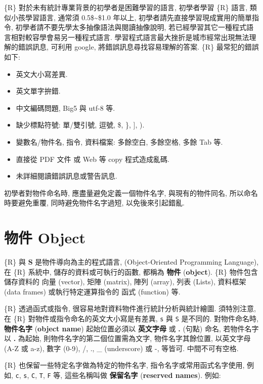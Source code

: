 \documentclass[
]{book}
\providecommand{\tightlist}{%
  \setlength{\itemsep}{0pt}\setlength{\parskip}{0pt}}
\begin{document}
\{R\} 對於未有統計專業背景的初學者是困難學習的語言,
初學者學習 \{R\} 語言, 類似小孩學習語言,
通常須 0.5\$\sim\$1.0 年以上,
初學者請先直接學習現成實用的簡單指令,
初學者請不要先學太多抽像語法與閱讀抽像說明,
若已經學習其它一種程式語言相對較容學會易另一種程式語言.
學習程式語言最大挫折是城市經常出現無法理解的錯誤訊息,
可利用 google, 將錯誤訊息尋找容易理解的答案.
\{R\} 最常犯的錯誤如下:

\begin{itemize}
\tightlist
\item
  英文大小寫差異.
\item
  英文單字拚錯.
\item
  中文編碼問題, Big5 與 utf-8 等.
\item
  缺少標點符號: 單/雙引號, 逗號, \$, \}, {]}, ).
\item
  變數名/物件名, 指令, 資料檔案: 多餘空白, 多餘空格, 多餘 Tab 等.
\item
  直接從 PDF 文件 或 Web 等 copy 程式造成亂碼.
\item
  未詳細閱讀錯誤訊息或警告訊息.
\end{itemize}

初學者對物件命名時, 應盡量避免定義一個物件名字,
與現有的物件同名, 所以命名時要避免重覆,
同時避免物件名字過短, 以免後來引起錯亂.

\hypertarget{ux7269ux4ef6-object}{%
\section{物件 Object}\label{ux7269ux4ef6-object}}

\{R\} 與 \textbf{S} 是物件導向為主的程式語言,
(Object-Oriented Programming Language),
在 \{R\} 系統中, 儲存的資料或可執行的函數, 都稱為
\textbf{物件}
(\textbf{object}).
\{R\} 物件包含儲存資料的
向量 (vector), 矩陣 (matrix), 陣列 (array), 列表 (Lists),
資料框架 (data frames)
或執行特定運算指令的
函式 (function) 等.

\{R\} 透過函式或指令, 很容易地對資料物件進行統計分析與統計繪圖.
須特別注意, 在 \{R\} 對物件或指令命名的英文大小寫是有差異,
\texttt{s} 與 \texttt{S} 是不同的.
對物件命名時,
\textbf{物件名字}
(\textbf{object name})
起始位置必須以 \textbf{英文字母} 或 \textbf{.} (句點) 命名,
若物件名字以 \textbf{.} 為起始,
則物件名字的第二個位置需為文字,
物件名字其餘位置,
以英文字母 (A-Z 或 a-z),
數字 (0-9), /, ., \_ (underscore) 或 -, 等皆可.
中間不可有空格.

\{R\} 也保留一些特定名字做為特定的物件名字,
指令名字或常用函式名字使用,
例如, \texttt{c}, \texttt{s}, \texttt{C}, \texttt{T}, \texttt{F} 等,
這些名稱叫做
\textbf{保留名字}
(\textbf{reserved names}).
例如:
\end{document}
